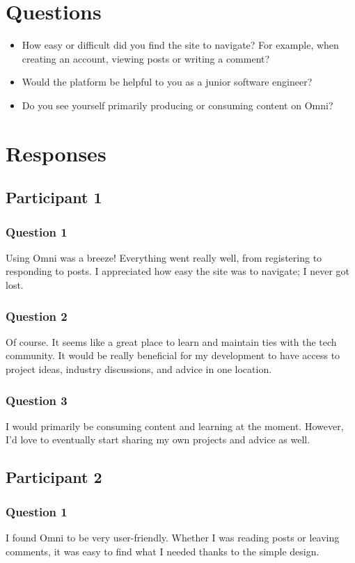 \section{Questions}
\begin{itemize}
    \item How easy or difficult did you find the site to navigate? For example, when creating an account, viewing posts or writing a comment?
    \item Would the platform be helpful to you as a junior software engineer?
    \item Do you see yourself primarily producing or consuming content on Omni?
\end{itemize}

\section{Responses}

\subsection{Participant 1}
\subsubsection{Question 1}
Using Omni was a breeze! Everything went really well, from registering to responding to posts. I appreciated how easy the site was to navigate; I never got lost.

\subsubsection{Question 2}
Of course. It seems like a great place to learn and maintain ties with the tech community. It would be really beneficial for my development to have access to project ideas, industry discussions, and advice in one location.

\subsubsection{Question 3}
I would primarily be consuming content and learning at the moment. However, I'd love to eventually start sharing my own projects and advice as well.

\subsection{Participant 2}
\subsubsection{Question 1}
I found Omni to be very user-friendly. Whether I was reading posts or leaving comments, it was easy to find what I needed thanks to the simple design.

